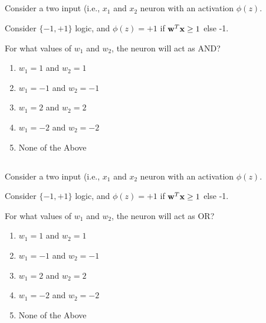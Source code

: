 \begin{frame}
\section{}
  Consider a two input (i.e., $x_1$ and $x_2$ neuron with an activation $\phi(z)$.

  Consider $\{-1,+1\}$ logic, and $\phi(z) = +1$ if ${\bf w}^T{\bf x} \geq 1$ else -1.

  For what values of $w_1$ and $w_2$, the neuron will act as AND?

    \begin{enumerate}[label=(\Alph*)]
      \item $w_1=1$ and $w_2=1$   %
      \item $w_1=-1$ and $w_2=-1$
      \item $w_1=2$ and $w_2=2$   %
      \item $w_1=-2$ and $w_2=-2$
      \item None of the Above    %
    \end{enumerate}
\end{frame}

\begin{frame}
\section{}
  Consider a two input (i.e., $x_1$ and $x_2$ neuron with an activation $\phi(z)$.

  Consider $\{-1,+1\}$ logic, and $\phi(z) = +1$ if ${\bf w}^T{\bf x} \geq 1$ else -1.

  For what values of $w_1$ and $w_2$, the neuron will act as OR?
     \begin{enumerate}[label=(\Alph*)]
      \item $w_1=1$ and $w_2=1$
      \item $w_1=-1$ and $w_2=-1$
      \item $w_1=2$ and $w_2=2$
      \item $w_1=-2$ and $w_2=-2$
      \item None of the Above   %
     \end{enumerate}
\end{frame}

